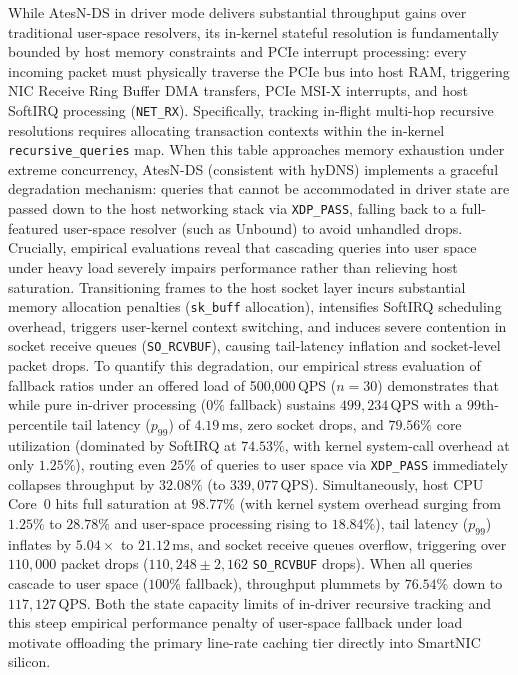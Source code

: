 \documentclass[a4paper,fleqn,colorlinks,hidelinks]{cas-sc}
\begin{document}
While AtesN-DS in driver mode delivers substantial throughput gains over traditional user-space resolvers, its in-kernel stateful resolution is fundamentally bounded by host memory constraints and PCIe interrupt processing: every incoming packet must physically traverse the PCIe bus into host RAM, triggering NIC Receive Ring Buffer DMA transfers, PCIe MSI-X interrupts, and host SoftIRQ processing (\texttt{NET\_RX}). Specifically, tracking in-flight multi-hop recursive resolutions requires allocating transaction contexts within the in-kernel \texttt{recursive\_queries} map. When this table approaches memory exhaustion under extreme concurrency, AtesN-DS (consistent with hyDNS) implements a graceful degradation mechanism: queries that cannot be accommodated in driver state are passed down to the host networking stack via \texttt{XDP\_PASS}, falling back to a full-featured user-space resolver (such as Unbound) to avoid unhandled drops. Crucially, empirical evaluations reveal that cascading queries into user space under heavy load severely impairs performance rather than relieving host saturation. Transitioning frames to the host socket layer incurs substantial memory allocation penalties (\texttt{sk\_buff} allocation), intensifies SoftIRQ scheduling overhead, triggers user-kernel context switching, and induces severe contention in socket receive queues (\texttt{SO\_RCVBUF}), causing tail-latency inflation and socket-level packet drops. To quantify this degradation, our empirical stress evaluation of fallback ratios under an offered load of 500,000\,QPS ($n=30$) demonstrates that while pure in-driver processing ($0\%$ fallback) sustains $499{,}234$\,QPS with a 99th-percentile tail latency ($p_{99}$) of $4.19$\,ms, zero socket drops, and $79.56\%$ core utilization (dominated by SoftIRQ at $74.53\%$, with kernel system-call overhead at only $1.25\%$), routing even $25\%$ of queries to user space via \texttt{XDP\_PASS} immediately collapses throughput by $32.08\%$ (to $339{,}077$\,QPS). Simultaneously, host CPU Core~0 hits full saturation at $98.77\%$ (with kernel system overhead surging from $1.25\%$ to $28.78\%$ and user-space processing rising to $18.84\%$), tail latency ($p_{99}$) inflates by $5.04\times$ to $21.12$\,ms, and socket receive queues overflow, triggering over $110{,}000$ packet drops ($110{,}248 \pm 2{,}162$ \texttt{SO\_RCVBUF} drops). When all queries cascade to user space ($100\%$ fallback), throughput plummets by $76.54\%$ down to $117{,}127$\,QPS. Both the state capacity limits of in-driver recursive tracking and this steep empirical performance penalty of user-space fallback under load motivate offloading the primary line-rate caching tier directly into SmartNIC silicon.
\end{document}
